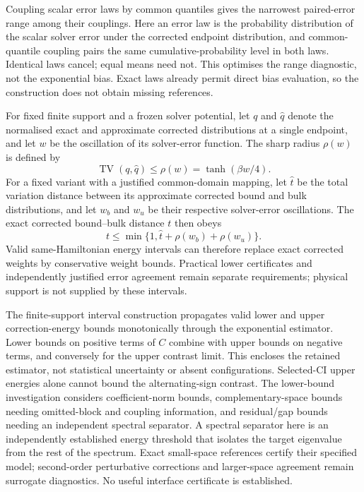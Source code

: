 \documentclass{article}
\begin{document}
Coupling scalar error laws by common quantiles gives the narrowest paired-error range among their couplings. Here an error law is the probability distribution of the scalar solver error under the corrected endpoint distribution, and common-quantile coupling pairs the same cumulative-probability level in both laws. Identical laws cancel; equal means need not. This optimises the range diagnostic, not the exponential bias. Exact laws already permit direct bias evaluation, so the construction does not obtain missing references.

For fixed finite support and a frozen solver potential, let \(q\) and \(\widehat q\) denote the normalised exact and approximate corrected distributions at a single endpoint, and let \(w\) be the oscillation of its solver-error function. The sharp radius \(\rho(w)\) is defined by
\[
\operatorname{TV}(q,\widehat q)\leq\rho(w)=\tanh(\beta w/4).
\]
For a fixed variant with a justified common-domain mapping, let \(\widehat t\) be the total variation distance between its approximate corrected bound and bulk distributions, and let \(w_b\) and \(w_u\) be their respective solver-error oscillations. The exact corrected bound--bulk distance \(t\) then obeys
\[
t\leq\min\{1,\widehat t+\rho(w_b)+\rho(w_u)\}.
\]
Valid same-Hamiltonian energy intervals can therefore replace exact corrected weights by conservative weight bounds. Practical lower certificates and independently justified error agreement remain separate requirements; physical support is not supplied by these intervals.

The finite-support interval construction propagates valid lower and upper correction-energy bounds monotonically through the exponential estimator. Lower bounds on positive terms of \(C\) combine with upper bounds on negative terms, and conversely for the upper contrast limit. This encloses the retained estimator, not statistical uncertainty or absent configurations. Selected-CI upper energies alone cannot bound the alternating-sign contrast. The lower-bound investigation considers coefficient-norm bounds, complementary-space bounds needing omitted-block and coupling information, and residual/gap bounds needing an independent spectral separator. A spectral separator here is an independently established energy threshold that isolates the target eigenvalue from the rest of the spectrum. Exact small-space references certify their specified model; second-order perturbative corrections and larger-space agreement remain surrogate diagnostics. No useful interface certificate is established.
\end{document}
